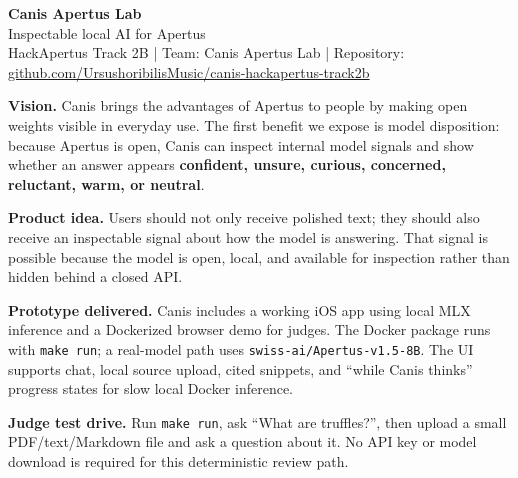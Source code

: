 \documentclass[10pt,a4paper]{article}
\begin{document}
\color{canisInk}

{\Huge\bfseries Canis Apertus Lab}\\[-1pt]
{\Large Inspectable local AI for Apertus}\\
{\small HackApertus Track 2B \quad | \quad Team: Canis Apertus Lab \quad | \quad Repository: \href{https://github.com/UrsushoribilisMusic/canis-hackapertus-track2b}{github.com/UrsushoribilisMusic/canis-hackapertus-track2b}}

\vspace{5pt}
\colorbox{canisSoft}{%
\begin{minipage}{0.97\linewidth}
\textbf{Vision.} Canis brings the advantages of Apertus to people by making open weights visible in everyday use. The first benefit we expose is model disposition: because Apertus is open, Canis can inspect internal model signals and show whether an answer appears \textbf{confident, unsure, curious, concerned, reluctant, warm, or neutral}.

\vspace{2pt}
\textbf{Product idea.} Users should not only receive polished text; they should also receive an inspectable signal about how the model is answering. That signal is possible because the model is open, local, and available for inspection rather than hidden behind a closed API.

\vspace{2pt}
\textbf{Prototype delivered.} Canis includes a working iOS app using local MLX inference and a Dockerized browser demo for judges. The Docker package runs with \texttt{make run}; a real-model path uses \texttt{swiss-ai/Apertus-v1.5-8B}. The UI supports chat, local source upload, cited snippets, and ``while Canis thinks'' progress states for slow local Docker inference.

\vspace{2pt}
\textbf{Judge test drive.} Run \texttt{make run}, ask ``What are truffles?'', then upload a small PDF/text/Markdown file and ask a question about it. No API key or model download is required for this deterministic review path.
\end{minipage}}
\end{document}
